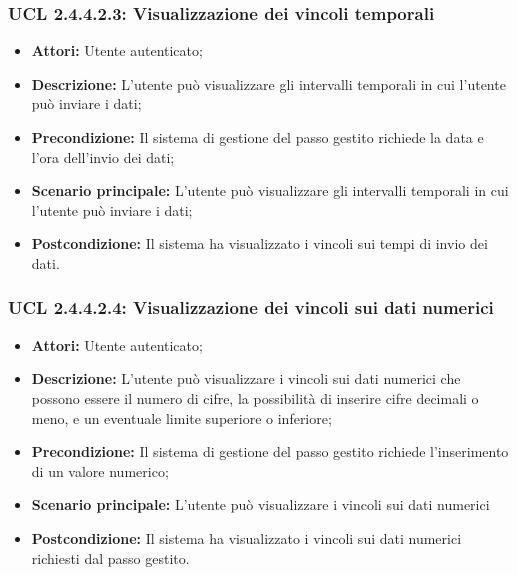 \hypertarget{L2.4.4.2.3}{}
\subsubsection{UCL 2.4.4.2.3: Visualizzazione dei vincoli temporali}
\begin{itemize}
\item \textbf{Attori:} Utente autenticato;
\item \textbf{Descrizione:} L'utente può visualizzare gli intervalli temporali in cui l'utente può inviare i dati;
\item \textbf{Precondizione:} Il sistema di gestione del passo gestito richiede la data e l'ora dell'invio dei dati;
\item \textbf{Scenario principale:} L'utente può visualizzare gli intervalli temporali in cui l'utente può inviare i dati; 
\item \textbf{Postcondizione:} Il sistema ha visualizzato i vincoli sui tempi di invio dei dati.
\end{itemize}

\hypertarget{L2.4.4.2.4}{}
\subsubsection{UCL 2.4.4.2.4: Visualizzazione dei vincoli sui dati numerici}
\begin{itemize}
\item \textbf{Attori:} Utente autenticato;
\item \textbf{Descrizione:} L'utente può visualizzare i vincoli sui dati numerici che possono essere il numero di cifre, la possibilità di inserire cifre decimali o meno, e un eventuale limite superiore o inferiore;
\item \textbf{Precondizione:} Il sistema di gestione del passo gestito richiede l'inserimento di un valore numerico;
\item \textbf{Scenario principale:} L'utente può visualizzare i vincoli sui dati numerici
\item \textbf{Postcondizione:} Il sistema ha visualizzato i vincoli sui dati numerici richiesti dal passo gestito.
\end{itemize}

